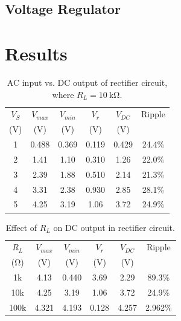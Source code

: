 \documentclass{article}
\begin{document}
\subsection{Voltage Regulator}
\label{sec:volt_reg}


\section{Results}
\label{sec:results}

\begin{table}[hbtp]
  \centering
  \begin{tabular}{cccccc}
    $V_S$ & $V_{max}$ & $V_{min}$ & $V_r$ & $V_{DC}$ & Ripple \\
    (V) & (V) & (V) & (V) & (V) &\\
    \hline
    1 & 0.488 & 0.369 & 0.119 & 0.429 & 24.4\% \\
    2 & 1.41 & 1.10 & 0.310 & 1.26 & 22.0\% \\
    3 & 2.39 & 1.88 & 0.510 & 2.14 & 21.3\% \\
    4 & 3.31 & 2.38 & 0.930 & 2.85 & 28.1\% \\
    5 & 4.25 & 3.19 & 1.06 & 3.72 & 24.9\% \\
  \end{tabular}
  \caption{\label{tab:rect_vp_vdc} AC input vs. DC output of rectifier circuit, where $R_L=\SI{10}{\kilo\ohm}$.}
\end{table}

\begin{table}[hbtp]
  \centering
  \begin{tabular}{cccccc}
    $R_L$ & $V_{max}$ & $V_{min}$ & $V_r$ & $V_{DC}$ & Ripple \\
    (\si{\ohm}) & (\si{V}) & (\si{V}) & (\si{V}) & (\si{V}) & \\
    \hline
    1k & 4.13 & 0.440 & 3.69 & 2.29 & 89.3\% \\
    10k & 4.25 & 3.19 & 1.06 & 3.72 & 24.9\% \\
    100k & 4.321 & 4.193 & 0.128 & 4.257 & 2.962\% \\
  \end{tabular}
  \caption{\label{tab:load_v_ripple} Effect of $R_L$ on DC output in rectifier circuit.}
\end{table}
\end{document}
